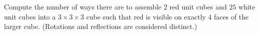 Compute the number of ways there are to assemble $2$ red unit cubes and $25$ white unit cubes into a $3 \times 3 \times 3$ cube such that red is visible on exactly $4$ faces of the larger cube. (Rotations and reflections are considered distinct.)